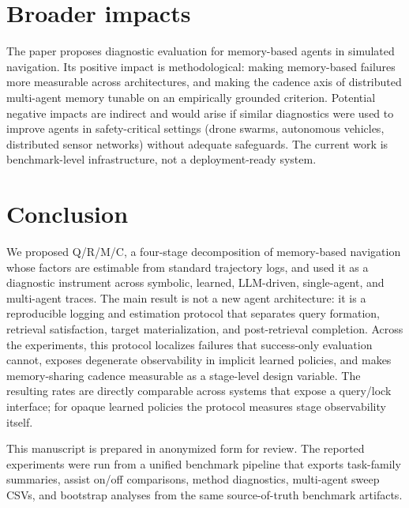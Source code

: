 \documentclass{article}
\begin{document}
\section{Broader impacts}

The paper proposes diagnostic evaluation for memory-based agents in simulated navigation. Its positive impact is methodological: making memory-based failures more measurable across architectures, and making the cadence axis of distributed multi-agent memory tunable on an empirically grounded criterion. Potential negative impacts are indirect and would arise if similar diagnostics were used to improve agents in safety-critical settings (drone swarms, autonomous vehicles, distributed sensor networks) without adequate safeguards. The current work is benchmark-level infrastructure, not a deployment-ready system.

\section{Conclusion}

We proposed Q/R/M/C, a four-stage decomposition of memory-based
navigation whose factors are estimable from standard trajectory logs,
and used it as a diagnostic instrument across symbolic, learned,
LLM-driven, single-agent, and multi-agent traces. The main result is
not a new agent architecture: it is a reproducible logging and
estimation protocol that separates query formation, retrieval
satisfaction, target materialization, and post-retrieval completion.
Across the experiments, this protocol localizes failures that
success-only evaluation cannot, exposes degenerate observability in
implicit learned policies, and makes memory-sharing cadence measurable
as a stage-level design variable. The resulting rates are directly
comparable across systems that expose a query/lock interface; for
opaque learned policies the protocol measures stage observability
itself.

\begin{ack}
This manuscript is prepared in anonymized form for review. The
reported experiments were run from a unified benchmark pipeline that
exports task-family summaries, assist on/off comparisons, method
diagnostics, multi-agent sweep CSVs, and bootstrap analyses from the
same source-of-truth benchmark artifacts.
\end{ack}
\end{document}
